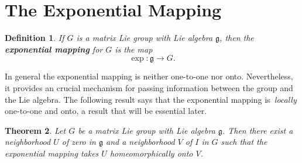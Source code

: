 \documentclass[12pt]{amsbook}
\let \frak = \mathfrak
\theoremstyle{plain}
\newtheorem{theorem}{Theorem}
\newtheorem{definition}[theorem]{Definition}
\numberwithin{equation}{chapter}
\numberwithin{theorem}{chapter}
\begin{document}
\section{The Exponential Mapping\label{exponential.mapping}}

\begin{definition}
If $G$ is a matrix Lie group with Lie algebra $\frak{g}$, then the
\textbf{exponential mapping} for $G$ is the map
\[
\exp:\frak{g}\rightarrow G\text{.}%
\]
\end{definition}

In general the exponential mapping is neither one-to-one nor onto.
Nevertheless, it provides an crucial mechanism for passing information between
the group and the Lie algebra. The following result says that the exponential
mapping is\textit{\ locally} one-to-one and onto, a result that will be
essential later.

\begin{theorem}
\label{local.log}Let $G$ be a matrix Lie group with Lie algebra $\frak{g}$.
Then there exist a neighborhood $U$ of zero in $\frak{g}$ and a neighborhood
$V$ of $I$ in $G$ such that the exponential mapping takes $U$ homeomorphically
onto $V$.
\end{theorem}
\end{document}
